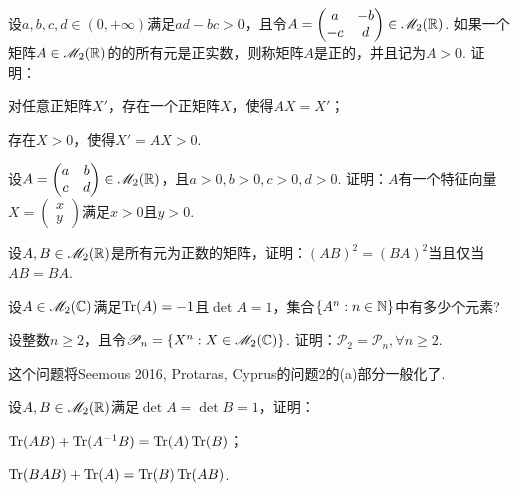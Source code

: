 \begin{problem}
   设$a,b,c,d\in(0,+\infty)$满足$ad-bc>0$，且令$A=\begin{pmatrix}
     a & - b\\
     -c & d
   \end{pmatrix}\in\mathscr M_2(\mathbb R)$. 如果一个矩阵$A\in\mathscr M_2(\mathbb R)$的的所有元是正实数，则称矩阵$A$是{\kaishu 正的}，并且记为$A>0$. 证明：
   \begin{enum}
     \item 对任意正矩阵$X'$，存在一个正矩阵$X$，使得$AX=X'$；
     \item 存在$X>0$，使得$X'=AX>0$.
   \end{enum}
\end{problem}

\begin{problem}
   \cite{58} 设$A=\begin{pmatrix}
    a & b \\
    c & d
  \end{pmatrix}\in\mathscr M_2(\mathbb R)$，且$a>0,b>0,c>0,d>0$. 证明：$A$有一个特征向量$X=\begin{pmatrix}
    x \\ y
  \end{pmatrix}$满足$x>0$且$y>0$.
\end{problem}

\begin{problem}
  设$A,B\in\mathscr M_2(\mathbb R)$是所有元为正数的矩阵，证明：$(AB)^2=(BA)^2$当且仅当$AB=BA$.
\end{problem}

\begin{problem}
  设$A\in\mathscr M_2(\mathbb C)$满足$\operatorname{Tr}(A)=-1$且$\det A=1$，集合$\{A^n:n\in\mathbb N\}$中有多少个元素?
\end{problem}

\begin{mybox}
  \begin{problem}[一个2016年的难题.]

   设整数$n\ge2$，且令$\mathscr P_n=\{X^n:X\in\mathscr M_2(\mathbb C)\}$. 证明：$\mathscr P_2=\mathscr P_n,\forall n\ge2$.

   这个问题将Seemous 2016, Protaras, Cyprus的问题2的(a)部分一般化了.
  \end{problem}
\end{mybox}

\begin{problem}
  设$A,B\in\mathscr M_2(\mathbb R)$满足$\det A=\det B=1$，证明：
  \begin{enum}
    \item $\operatorname{Tr}(AB)+\operatorname{Tr}(A^{-1}B)=\operatorname{Tr}(A)\operatorname{Tr}(B)$；
    \item $\operatorname{Tr}(BAB)+\operatorname{Tr}(A)=\operatorname{Tr}(B)\operatorname{Tr}(AB)$.
  \end{enum}
\end{problem}

